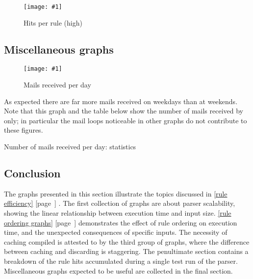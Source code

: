 \documentclass[a4paper,12pt,draft]{article}
\newcommand{\showgraph}[3]{
    \begin{figure}[hbt!]
        \caption{#2}\label{#3}
        \texttt{[image: \#1]}
    \end{figure}
}
\newcommand{\showtable}[3]{
    \begin{table}[ht]
        \caption{#2}\label{#3}
        
    \end{table}
}
\newcommand{\refwithpage}[1]{%
    \empty{}\ref{#1} [page~\pageref{#1}]%
}
\newcommand{\sectionref}[1]{%
    \textsection{}\refwithpage{#1}%
}
\begin{document}
\showgraph{build/plot-hits-high}{Hits per rule (high)}{hits per rule
high}

\clearpage



\subsection{Miscellaneous graphs}

\label{Miscellaneous graphs}

\showgraph{build/plot-mails-received}{Mails received per day}{Mails
received per day}

As expected there are far more mails received on weekdays than at weekends.
Note that this graph and the table below show the number of mails received
by \SMTP{} only; in particular the mail loops noticeable in other graphs
do not contribute to these figures.

\showtable{build/mails-received-include-for-graph}{Number of mails received
per day: statistics}{Number of mails received per day: statistics}

\clearpage

\subsection{Conclusion}

The graphs presented in this section illustrate the topics discussed in
\sectionref{rule efficiency}.  The first collection of graphs are about
parser scalability, showing the linear relationship between execution time
and input size.  \sectionref{rule ordering graphs} demonstrates the effect
of rule ordering on execution time, and the unexpected consequences of
specific inputs.  The necessity of caching compiled \regexes{} is attested
to by the third group of graphs, where the difference between caching and
discarding is staggering.  The penultimate section contains a breakdown of
the rule hits accumulated during a single test run of the parser.
Miscellaneous graphs expected to be useful are collected in the final
section.  


\renewcommand{\glossarytitle}{\section{Glossary}\label{Glossary}}
\printglossary{}
\renewcommand{\glossarytitle}{\section{Acronyms}\label{Acronyms}}
\printacronym{}
\end{document}
